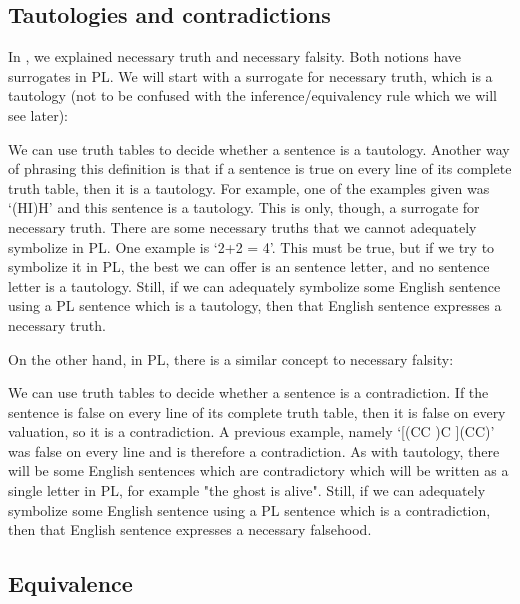 \subsection{Tautologies and contradictions}

In , we explained necessary truth and necessary falsity. Both notions have surrogates in PL. We will start with a surrogate for necessary truth, which is a \gls{tautology} (not to be confused with the inference/equivalency rule which we will see later):


We can use truth tables to decide whether a sentence is a tautology. Another way of phrasing this definition is that if a sentence is true on every line of its complete truth table, then it is a tautology. For example, one of the examples given was ‘(H\eand I)\eif H’ and this sentence is a tautology. This is only, though, a surrogate for necessary truth. There are some necessary truths that we cannot adequately symbolize in PL. One example is ‘2+2 = 4’. This must be true, but if we try to symbolize it in PL, the best we can offer is an sentence letter, and no sentence letter is a tautology. Still, if we can adequately symbolize some English sentence using a PL sentence which is a tautology, then that English sentence expresses a necessary truth.

On the other hand, in PL, there is a similar concept to necessary falsity:


We can use truth tables to decide whether a sentence is a contradiction. If the sentence is false on every line of its complete truth table, then it is false on every valuation, so it is a contradiction. A previous example, namely ‘[(C\eiff C )\eif C ]\eand \enot (C\eif C)’ was false on every line and is therefore a contradiction. As with tautology, there will be some English sentences which are contradictory which will be written as a single letter in PL, for example "the ghost is alive". Still, if we can adequately symbolize some English sentence using a PL sentence which is a contradiction, then that English sentence expresses a necessary falsehood.

\subsection{Equivalence}

